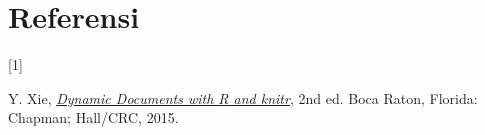 \documentclass[
  indonesian,
  letterpaper,
]{book}
\newlength{\cslhangindent}
\newlength{\csllabelwidth}
\newenvironment{CSLReferences}[2] %
 {\begin{list}{}{%
  \setlength{\itemindent}{0pt}
  \setlength{\leftmargin}{0pt}
  \setlength{\parsep}{0pt}
  \ifodd #1
   \setlength{\leftmargin}{\cslhangindent}
   \setlength{\itemindent}{-1\cslhangindent}
  \fi
  \setlength{\itemsep}{#2\baselineskip}}}
 {\end{list}}
\newcommand{\CSLLeftMargin}[1]{\parbox[t]{\csllabelwidth}{\strut#1\strut}}
\newcommand{\CSLRightInline}[1]{\parbox[t]{\linewidth - \csllabelwidth}{\strut#1\strut}}
\begin{document}

\chapter*{Referensi}\label{referensi}


\protect{}\label{refs}
\begin{CSLReferences}{0}{0}
\CSLLeftMargin{{[}1{]} }%
\CSLRightInline{Y. Xie, \emph{\href{http://yihui.name/knitr/}{Dynamic
Documents with {R} and knitr}}, 2nd ed. Boca Raton, Florida: Chapman;
Hall/CRC, 2015.}

\end{CSLReferences}


\backmatter
\end{document}
